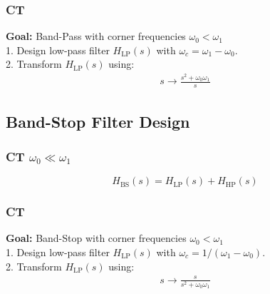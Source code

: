 	\subsubsection{CT}
		\textbf{Goal:} Band-Pass with corner frequencies $\omega_0 < \omega_1$\\
		1. Design low-pass filter $H_\text{LP}(s)$ with $\omega_c = \omega_1-\omega_0$.\\
		2. Transform $H_\text{LP}(s)$ using:
		\vspace{-0.5em}
		\begin{align*}
			s \to \frac{s^2+\omega_0\omega_1}{s}
		\end{align*}

\subsection{Band-Stop Filter Design}
	\subsubsection{CT \texorpdfstring{\hfill $\omega_0 \ll \omega_1$}{w0 << w1}}
		\vspace{-0.5em}$$H_\text{BS}(s) = H_\text{LP}(s) + H_\text{HP}(s)$$
	\subsubsection{CT}
		\textbf{Goal:} Band-Stop with corner frequencies $\omega_0 < \omega_1$\\
		1. Design low-pass filter $H_\text{LP}(s)$ with $\omega_c = 1/(\omega_1-\omega_0)$.\\
		2. Transform $H_\text{LP}(s)$ using:
		\vspace{-0.5em}
		\begin{align*}
			s \to \frac{s}{s^2+\omega_0\omega_1}
		\end{align*}
